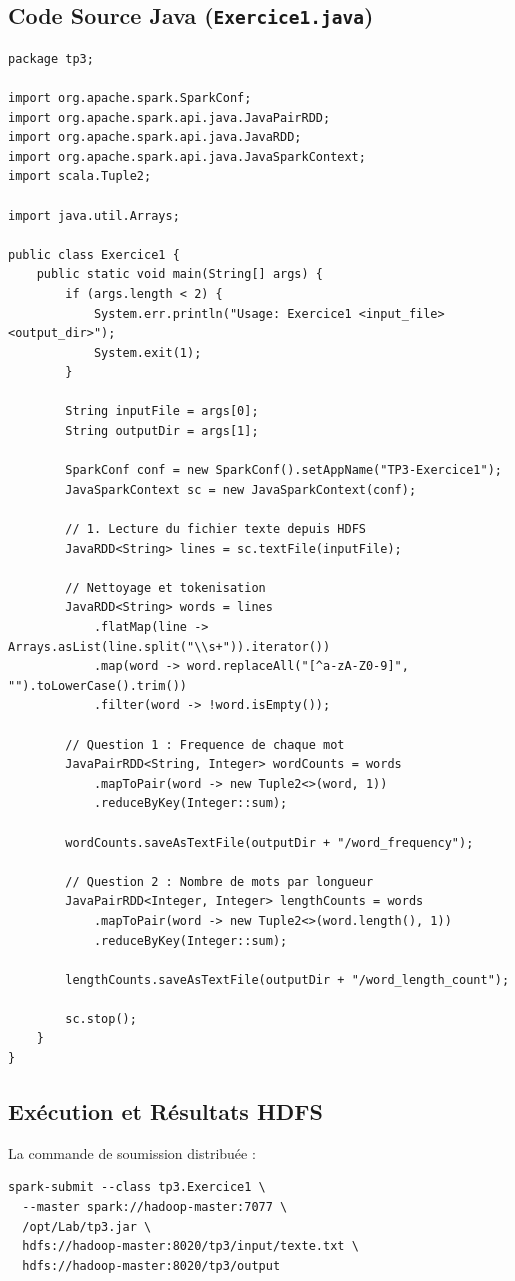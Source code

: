 \documentclass[11pt,a4paper]{article}
\begin{document}
\subsection{Code Source Java (\texttt{Exercice1.java})}
\begin{lstlisting}[style=customjava]
package tp3;

import org.apache.spark.SparkConf;
import org.apache.spark.api.java.JavaPairRDD;
import org.apache.spark.api.java.JavaRDD;
import org.apache.spark.api.java.JavaSparkContext;
import scala.Tuple2;

import java.util.Arrays;

public class Exercice1 {
    public static void main(String[] args) {
        if (args.length < 2) {
            System.err.println("Usage: Exercice1 <input_file> <output_dir>");
            System.exit(1);
        }

        String inputFile = args[0];
        String outputDir = args[1];

        SparkConf conf = new SparkConf().setAppName("TP3-Exercice1");
        JavaSparkContext sc = new JavaSparkContext(conf);

        // 1. Lecture du fichier texte depuis HDFS
        JavaRDD<String> lines = sc.textFile(inputFile);

        // Nettoyage et tokenisation
        JavaRDD<String> words = lines
            .flatMap(line -> Arrays.asList(line.split("\\s+")).iterator())
            .map(word -> word.replaceAll("[^a-zA-Z0-9]", "").toLowerCase().trim())
            .filter(word -> !word.isEmpty());

        // Question 1 : Frequence de chaque mot
        JavaPairRDD<String, Integer> wordCounts = words
            .mapToPair(word -> new Tuple2<>(word, 1))
            .reduceByKey(Integer::sum);

        wordCounts.saveAsTextFile(outputDir + "/word_frequency");

        // Question 2 : Nombre de mots par longueur
        JavaPairRDD<Integer, Integer> lengthCounts = words
            .mapToPair(word -> new Tuple2<>(word.length(), 1))
            .reduceByKey(Integer::sum);

        lengthCounts.saveAsTextFile(outputDir + "/word_length_count");

        sc.stop();
    }
}
\end{lstlisting}

\subsection{Exécution et Résultats HDFS}
La commande de soumission distribuée :
\begin{lstlisting}[style=custombash]
spark-submit --class tp3.Exercice1 \
  --master spark://hadoop-master:7077 \
  /opt/Lab/tp3.jar \
  hdfs://hadoop-master:8020/tp3/input/texte.txt \
  hdfs://hadoop-master:8020/tp3/output
\end{lstlisting}
\end{document}
